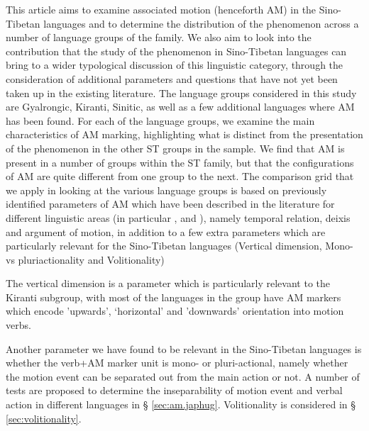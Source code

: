 \documentclass[oneside,a4paper,11pt]{article}
\begin{document}
This article aims to examine associated motion (henceforth AM) in the Sino-Tibetan languages and to determine the distribution of the phenomenon across a number of language groups of the family.  We also aim to look into the contribution that the study of the phenomenon in Sino-Tibetan languages can bring to a wider typological discussion of this linguistic category, through the consideration of additional parameters and questions that have not yet been taken up in the existing literature.  
The language groups considered in this study are Gyalrongic, Kiranti, Sinitic, as well as a few additional languages where AM has been found.  For each of the language groups, we examine the main characteristics of AM marking, highlighting what is distinct from the presentation of the phenomenon in the other ST groups in the sample.  We find that AM is present in a number of groups within the ST family, but that the configurations of AM are quite different from one group to the next.  The comparison grid that we apply in looking at the various language groups is based on  previously identified parameters of AM which have been described in the literature for different linguistic areas (in particular \citealt{koch84associated.motion}, \citealt{wilkins91associated.motion} and \citealt{guillaume16am}), namely temporal relation, deixis and argument of motion, in addition to a few extra parameters which are particularly relevant for the Sino-Tibetan languages (Vertical dimension, Mono- vs pluriactionality and Volitionality)

The vertical dimension is a parameter which is particularly relevant to the Kiranti subgroup, with most of the languages in the group have AM markers which encode  'upwards', `horizontal' and 'downwards' orientation into motion verbs.

Another parameter we have found to be relevant in the Sino-Tibetan languages is whether the verb+AM marker unit is mono- or pluri-actional, namely whether the motion event can be separated out from the main action or not.  A number of tests are proposed to determine the inseparability of motion event and verbal action in different languages in § \ref{sec:am.japhug}. Volitionality is considered in § \ref{sec:volitionality}.
\end{document}
